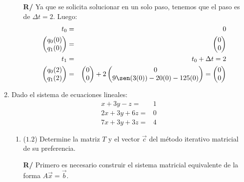 \documentclass[12pt]{article}
\begin{document}
\begin{enumerate}[leftmargin=*,widest=9]
\begin{enumerate}[label=\alph*]
\textbf{R/} Ya que se solicita solucionar en un solo paso, tenemos que el paso es de \(\Delta t = 2\). Luego:
\begin{eqnarray*}
t_0 & = & 0\\
\begin{pmatrix}
q_0(0) \\ q_1(0)
\end{pmatrix} &=& \begin{pmatrix}
0 \\ 0
\end{pmatrix} \\
t_1 & = & t_0 + \Delta t = 2\\
	\begin{pmatrix}
		q_0(2) \\ q_1(2)
	\end{pmatrix} &=& \begin{pmatrix}
						0\\0
					\end{pmatrix} + 2 \begin{pmatrix}
											0\\ 9\sen(3(0)) - 20(0) - 125(0)
										\end{pmatrix} = \begin{pmatrix}
															0 \\ 0
														\end{pmatrix}
\end{eqnarray*}
    \end{enumerate}
    \item Dado el sistema de ecuaciones lineales:
\begin{align*}
    x + 3y-z =& 1 \\
    2x + 3y + 6z =& 0 \\
    7x + 3y + 3z =& 4
    \end{align*}
    \begin{enumerate}[label=\alph*]
    \item (\(1.2\)) Determine la matriz \(T\) y el vector \(\vec{c}\) del método iterativo matricial de su preferencia.
    
    \textbf{R/} Primero es necesario construir el sistema matricial equivalente de la forma \(A\vec{x}=\vec{b}\).
    

\end{enumerate}
\end{enumerate}
\end{document}
